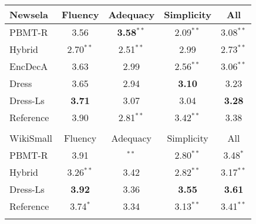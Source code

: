 \documentclass[11pt,letterpaper]{article}
\begin{document}
\begin{table}[t]
	\centering
	\setlength{\belowcaptionskip}{-.5cm}
	\small
	\begin{tabular}{|@{~} l@{~} |@{~} c@{~} c@{~}  c@{~}  c@{~} |}
		\hline
		Newsela & Fluency & Adequacy & Simplicity & All \\
		\hline
		\hline
		PBMT-R & 3.56 & \hspace*{2ex}\bf{3.58}$^{**}$& \hspace*{2ex}2.09$^{**}$ & \hspace*{2ex}3.08$^{**}$ \\
		Hybrid & \hspace*{2ex}2.70$^{**}$ & \hspace*{2ex}2.51$^{**}$ & 2.99 & \hspace*{2ex}2.73$^{**}$ \\
		EncDecA & 3.63 & 2.99 & \hspace*{2ex}2.56$^{**}$ & \hspace*{2ex}3.06$^{**}$ \\
		{\sc Dress} & 3.65 & 2.94 & \bf{3.10} & 3.23 \\
		{\sc Dress-Ls} & \bf{3.71} & 3.07 & 3.04 & \bf{3.28} \\
		Reference & 3.90 & \hspace*{2ex}2.81$^{**}$ & \hspace*{2ex}3.42$^{**}$ & 3.38 \\ \hline
		\multicolumn{4}{c}{} \\\hline
		WikiSmall & Fluency & Adequacy & Simplicity & All \\
		\hline
		\hline
		PBMT-R & 3.91 & \hspace*{2ex}{\bf 3.74}$^{**}$ & \hspace{2ex}2.80$^{**}$ & \hspace{1ex}3.48$^{*}$ \\
		Hybrid & \hspace*{2ex}3.26$^{**}$ & 3.42 & \hspace{2ex}2.82$^{**}$ & \hspace{2ex}3.17$^{**}$ \\
		{\sc Dress-Ls} & \bf{3.92} & 3.36 & \bf{3.55} & \bf{3.61} \\
		Reference & \hspace{1ex}3.74$^{*}$ & 3.34 & \hspace{2ex}3.13$^{**}$ & \hspace{2ex}3.41$^{**}$ \\\hline
		\multicolumn{4}{c}{} \\\hline
		

\end{tabular}
\end{table}
\end{document}
